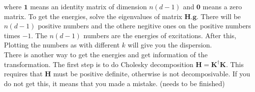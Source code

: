 \documentclass[letter]{article}
\begin{document}
where $\mathbf{1}$ means an identity matrix of dimension $n(d-1)$ and $\mathbf{0}$ means a zero matrix. To get the energies, solve the eigenvalues of matrix $\mathbf{H}.\mathbf{g}$. There will be $n(d-1)$ positive numbers and the othere negitive ones on the positive numbers times $-1$. The $n(d-1)$ numbers are the energies of excitations. After this, Plotting the numbers as with different $k$ will give you the dispersion. \\
There is another way to get the energies and get information of the transformation. The first step is to do Cholesky decomposition $\mathbf{H}=\mathbf{K}^{\dagger}\mathbf{K}$. This requires that $\mathbf{H}$ must be positive definite, otherwise is not decomposivable. If you do not get this, it means that you made a mistake. (needs to be finished) \\
\end{document}
